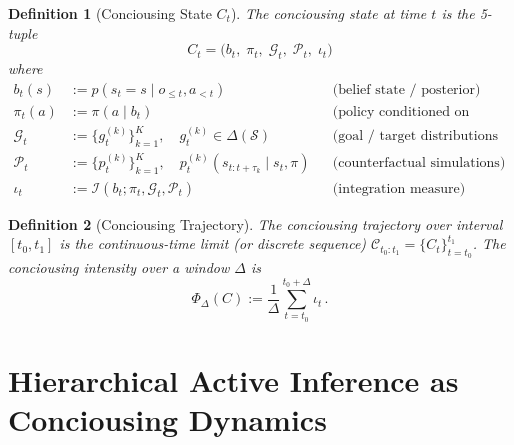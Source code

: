 \documentclass[11pt,a4paper]{article}
\newcommand{\Sset}{\mathcal{S}}
\newcommand{\Iset}{\mathcal{I}}
\newcommand{\Gvec}{\mathcal{G}}
\newcommand{\Pvec}{\mathcal{P}}
\newcommand{\Ccal}{\mathcal{C}}
\newcommand{\given}{\mid}
\newtheorem{definition}{Definition}
\begin{document}
\begin{definition}[Conciousing State $C_t$]
The \emph{conciousing state} at time $t$ is the 5-tuple
\begin{equation}
C_t = \bigl( b_t,\; \pi_t,\; \Gvec_t,\; \Pvec_t,\; \iota_t \bigr)
\label{eq:Ct}
\end{equation}
where
\begin{align}
b_t(s) &:= p(s_t = s \given o_{\le t}, a_{<t}) && \text{(belief state / posterior)} \label{eq:belief} \\
\pi_t(a) &:= \pi(a \given b_t) && \text{(policy conditioned on belief)} \label{eq:policy} \\
\Gvec_t &:= \{ g^{(k)}_t \}_{k=1}^K, \quad g^{(k)}_t \in \Delta(\Sset) && \text{(goal / target distributions per timescale)} \label{eq:goals} \\
\Pvec_t &:= \{ p^{(k)}_t \}_{k=1}^K, \quad p^{(k)}_t(s_{t:t+\tau_k} \given s_t, \pi) && \text{(counterfactual simulations)} \label{eq:sims} \\
\iota_t &:= \Iset(b_t; \pi_t, \Gvec_t, \Pvec_t) && \text{(integration measure)} \label{eq:iota}
\end{align}
\end{definition}

\begin{definition}[Conciousing Trajectory]
The \emph{conciousing trajectory} over interval $[t_0, t_1]$ is the continuous-time limit (or discrete sequence) $\Ccal_{t_0:t_1} = \{ C_t \}_{t=t_0}^{t_1}$.
The \emph{conciousing intensity} over a window $\Delta$ is
\[
\Phi_\Delta(C) := \frac{1}{\Delta} \sum_{t=t_0}^{t_0+\Delta} \iota_t \,.
\]
\end{definition}

\section{Hierarchical Active Inference as Conciousing Dynamics}
\label{sec:hai}
\end{document}
